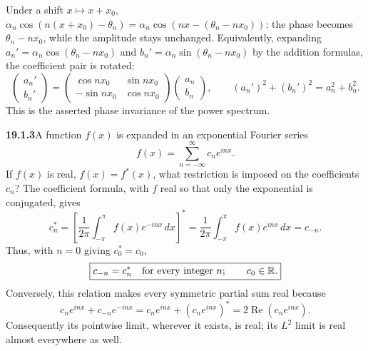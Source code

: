 Under a shift $x\mapsto x+x_0$,
$\alpha_n\cos(n(x+x_0)-\theta_n)=\alpha_n\cos(nx-(\theta_n-nx_0))$:
the phase becomes $\theta_n-nx_0$, while the amplitude stays unchanged.
Equivalently, expanding
$a_n'=\alpha_n\cos(\theta_n-nx_0)$ and
$b_n'=\alpha_n\sin(\theta_n-nx_0)$ by the addition formulas, the
coefficient pair is rotated:
\[
\begin{pmatrix}a_n'\\b_n'\end{pmatrix}
=\begin{pmatrix}\cos nx_0&\sin nx_0\\-\sin nx_0&\cos nx_0\end{pmatrix}
\begin{pmatrix}a_n\\b_n\end{pmatrix},
\qquad (a_n')^2+(b_n')^2=a_n^2+b_n^2.
\]
This is the asserted phase invariance of the power spectrum.

\par\bigskip
\noindent\textbf{19.1.3}\quad A function $f(x)$ is expanded in an
exponential Fourier series
\[
f(x)=\sum_{n=-\infty}^{\infty}c_{n}e^{inx}.
\]
If $f(x)$ is real, $f(x)=f^{*}(x)$, what restriction is imposed on
the coefficients $c_{n}$?
\solution
The coefficient formula, with $f$ real so that only the exponential is
conjugated, gives
\[
c_n^*=\left[\frac1{2\pi}\int_{-\pi}^{\pi}f(x)e^{-inx}\,dx\right]^*
=\frac1{2\pi}\int_{-\pi}^{\pi}f(x)e^{inx}\,dx=c_{-n}.
\]
Thus, with $n=0$ giving $c_0^*=c_0$,
\[
\boxed{c_{-n}=c_n^*\quad\hbox{for every integer }n;\qquad c_0\in\mathbb R.}
\]
Conversely, this relation makes every symmetric partial sum real because
\[
c_ne^{inx}+c_{-n}e^{-inx}=c_ne^{inx}+(c_ne^{inx})^*
=2\operatorname{Re}(c_ne^{inx}).
\]
Consequently its pointwise limit, wherever it exists, is real; its
$L^2$ limit is real almost everywhere as well.

